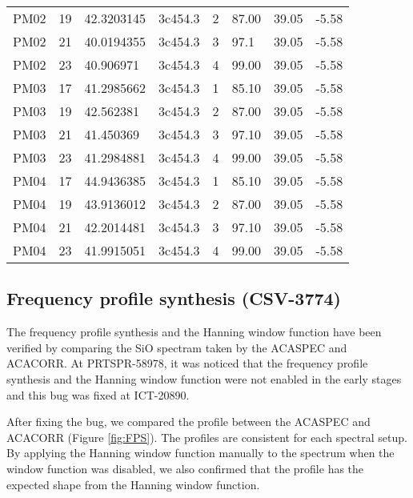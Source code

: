 \begin{table}[]
\begin{tabular}{llllllll}
PM02             & 19  & 42.3203145 & 3c454.3 & 2  & 87.00 & 39.05   & -5.58       \\
PM02             & 21  & 40.0194355 & 3c454.3 & 3  & 97.1 & 39.05   & -5.58       \\
PM02             & 23  & 40.906971  & 3c454.3 & 4  & 99.00 & 39.05   & -5.58       \\
PM03             & 17  & 41.2985662 & 3c454.3 & 1  & 85.10 & 39.05   & -5.58       \\
PM03             & 19  & 42.562381  & 3c454.3 & 2  & 87.00 & 39.05   & -5.58       \\
PM03             & 21  & 41.450369  & 3c454.3 & 3  & 97.10 & 39.05   & -5.58       \\
PM03             & 23  & 41.2984881 & 3c454.3 & 4  & 99.00 & 39.05   & -5.58       \\
PM04             & 17  & 44.9436385 & 3c454.3 & 1  & 85.10 & 39.05   & -5.58       \\
PM04             & 19  & 43.9136012 & 3c454.3 & 2  & 87.00 & 39.05   & -5.58       \\
PM04             & 21  & 42.2014481 & 3c454.3 & 3  & 97.10 & 39.05   & -5.58       \\
PM04             & 23  & 41.9915051 & 3c454.3 & 4  & 99.00 & 39.05   & -5.58       \\ \hline \hline
\end{tabular}
\end{table}


\subsection{Frequency profile synthesis (CSV-3774)}

The frequency profile synthesis and the Hanning window function have been verified by comparing the SiO spectram taken by the ACASPEC and ACACORR. At PRTSPR-58978, it was noticed that the frequency profile synthesis and the Hanning window function were not enabled in the early stages and this bug was fixed at ICT-20890. 

After fixing the bug, we compared the profile between the ACASPEC and ACACORR (Figure \ref{fig:FPS}). The profiles are consistent for each spectral setup. By applying the Hanning window function manually to the spectrum when the window function was disabled, we also confirmed that the profile has the expected shape from the Hanning window function.  

